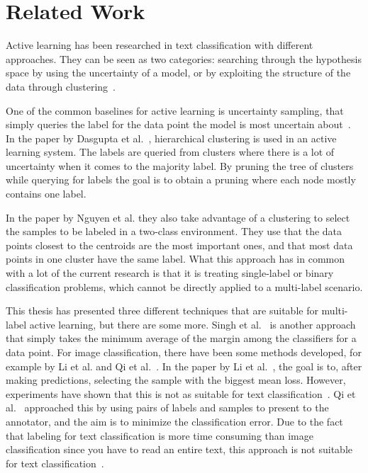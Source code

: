 \section{Related Work}

Active learning has been researched in text classification with different approaches.
They can be seen as two categories: searching through the hypothesis space by using the uncertainty of a model, or by exploiting the structure of the data through clustering~\cite{dasgupta2008hierarchical}.

One of the common baselines for active learning is uncertainty sampling, that simply queries the label for the data point the model is most uncertain about~\cite{lewis1994sequential}.
In the paper by Dasgupta et al\@.~\cite{dasgupta2008hierarchical}, hierarchical clustering is used in an active learning system.
The labels are queried from clusters where there is a lot of uncertainty when it comes to the majority label.
By pruning the tree of clusters while querying for labels the goal is to obtain a pruning where each node mostly contains one label.

In the paper by Nguyen et al\@.\cite{nguyen2004active} they also take advantage of a clustering to select the samples to be labeled in a two-class environment.
They use that the data points closest to the centroids are the most important ones, and that most data points in one cluster have the same label.
What this approach has in common with a lot of the current research is that it is treating single-label or binary classification problems, which cannot be directly applied to a multi-label scenario.

This thesis has presented three different techniques that are suitable for multi-label active learning, but there are some more.
Singh et al\@.~\cite{singh2009active} is another approach that simply takes the minimum average of the margin among the classifiers for a data point.
For image classification, there have been some methods developed, for example by Li et al\@. and Qi et al\@.~\cite{li2004multilabel, qi2008two}.
In the paper by Li et al\@.~\cite{li2004multilabel}, the goal is to, after making predictions, selecting the sample with the biggest mean loss.
However, experiments have shown that this is not as suitable for text classification~\cite{yang2009effective}.
Qi et al\@.~\cite{qi2008two} approached this by using pairs of labels and samples to present to the annotator, and the aim is to minimize the classification error.
Due to the fact that labeling for text classification is more time consuming than image classification since you have to read an entire text, this approach is not suitable for text classification~\cite{yang2009effective}.

